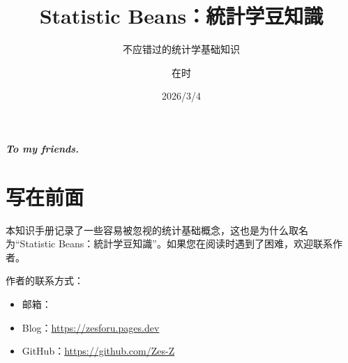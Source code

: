 \documentclass[lang=cn,10pt]{elegantbook}
\title{Statistic Beans：統計学豆知識}
\subtitle{不应错过的统计学基础知识}
\author{在时}
\date{ 2026/3/4}
\begin{document}
\maketitle

\frontmatter


\newpage
\thispagestyle{empty}
\vspace*{\fill}
\begin{center}
    \large \textbf{\textit{To my friends.}}
\end{center}
\vfill  


\tableofcontents
\mainmatter



\chapter{写在前面}

本知识手册记录了一些容易被忽视的统计基础概念，这也是为什么取名为“Statistic Beans：統計学豆知識”。如果您在阅读时遇到了困难，欢迎联系作者。

作者的联系方式：
\begin{itemize}
  \item 邮箱：
  \item Blog：\href{https://zes4u.pages.dev}{https://zesforu.pages.dev}
  \item GitHub：\href{https://github.com/Zes-Z}{https://github.com/Zes-Z}
\end{itemize}
\end{document}
